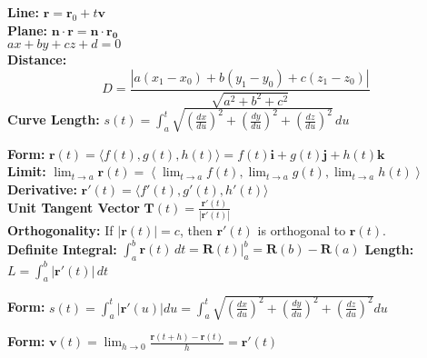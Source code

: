 \documentclass[2pt]{article}
\begin{document}
\begin{multicols}{2}
\begin{tcolorbox}[title=\textbf{Lines and Planes}, colframe=lightblue]
\textbf{Line:} $\mathbf{r} = \mathbf{r}_0 + t \mathbf{v}$ \\
\textbf{Plane:} $\mathbf{n} \cdot \mathbf{r} = \mathbf{n} \cdot \mathbf{r_0}$ \\
$ax + by + cz + d = 0$ \\
\textbf{Distance:}  
    \[ D = \frac{|a(x_1 - x_0) + b(y_1 - y_0) + c(z_1 - z_0)|}{\sqrt{a^2 + b^2 + c^2}} \]
\textbf{Curve Length:} $s(t) = \int_{a}^{t} \sqrt{\left(\frac{dx}{du}\right)^2 + \left(\frac{dy}{du}\right)^2 + \left(\frac{dz}{du}\right)^2} \, du$
\end{tcolorbox}

\begin{tcolorbox}[title=\textbf{Vector Value Functions}, colframe=lightblue]
    \textbf{Form:} 	$ \mathbf{r}(t) = \langle f(t), g(t), h(t) \rangle = f(t) \mathbf{i} + g(t) \mathbf{j} + h(t) \mathbf{k} $ \\
    \textbf{Limit:} $ \lim_{t \to a} \mathbf{r}(t) = \left\langle \lim_{t \to a} f(t), \lim_{t \to a} g(t), \lim_{t \to a} h(t) \right\rangle $ \\
    \textbf{Derivative:} $\mathbf{r}'(t) = \langle f'(t), g'(t), h'(t) \rangle $ \\
    \textbf{Unit Tangent Vector} $\mathbf{T}(t) = \frac{\mathbf{r}'(t)}{|\mathbf{r}'(t)|}$ \\
    \textbf{Orthogonality:} If \(|\mathbf{r}(t)| = c\), then \(\mathbf{r}'(t)\) is orthogonal to \(\mathbf{r}(t)\). \\
    \textbf{Definite Integral:} $ \int_a^b \mathbf{r}(t) \, dt = \mathbf{R}(t) \Big|_a^b = \mathbf{R}(b) - \mathbf{R}(a) $
    \textbf{Length:} $ L = \int_a^b |\mathbf{r}'(t)| \, dt$
\end{tcolorbox}

\begin{tcolorbox}[title=\textbf{Curvature}, colframe=lightblue]
    \textbf{Form:} 	$ s(t) = \int_{a}^{t} |\mathbf{r}'(u)| du = \int_{a}^{t} \sqrt{\left(\frac{dx}{du}\right)^{2} + \left(\frac{dy}{du}\right)^{2} + \left(\frac{dz}{du}\right)^{2}} du $ 
\end{tcolorbox}

\begin{tcolorbox}[title=\textbf{Motion in space}, colframe=lightblue]
    \textbf{Form:} 	$ \mathbf{v}(t) = \lim_{{h \to 0}} \frac{\mathbf{r}(t + h) - \mathbf{r}(t)}{h} = \mathbf{r}'(t) $ 
\end{tcolorbox}


\end{multicols}
\end{document}
